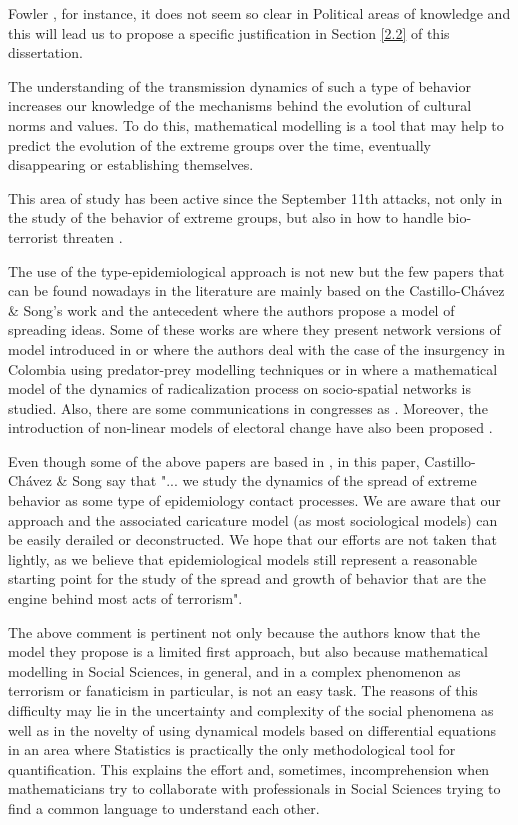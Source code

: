 Fowler \cite{CF}, for instance, it does not seem so clear in Political areas of knowledge and this will lead us to propose a specific justification in Section \ref{2.2} of this dissertation.

The understanding of the transmission dynamics of such a type of behavior increases our knowledge of the mechanisms behind the evolution of cultural norms and values. To do this, mathematical modelling is a tool that may help to predict the evolution of the extreme groups over the time, eventually disappearing or establishing themselves.

This area of study has been active since the September 11th attacks, not only in the study of the behavior of extreme groups, but also in how to handle bio-terrorist threaten \cite{libroF}.

The use of the type-epidemiological approach is not new but the few papers that can be found nowadays in the literature are mainly based on the Castillo-Ch\'avez \& Song's work \cite{Fanatismo} and the antecedent \cite{GoodIdea} where the authors propose a model of spreading ideas. Some of these works are \cite{stauffer1, stauffer2} where they present network versions of model introduced in \cite{Fanatismo} or \cite{Colomb} where the authors deal with the case of the insurgency in Colombia using predator-prey modelling techniques or in \cite{cherif} where a mathematical model of the dynamics of radicalization process on socio-spatial networks is studied. Also, there are some communications in congresses as \cite{Arney, Jairo, Jairo0}. Moreover, the introduction of non-linear models of electoral change have also been proposed \cite{WEISBERG}.

Even though some of the above papers are based in \cite{Fanatismo}, in this paper, Castillo-Ch\'avez \& Song say that "... we study the dynamics of the spread of extreme behavior as some type of epidemiology contact processes. We are aware that our approach and the associated caricature model (as most sociological models) can be easily derailed or deconstructed. We hope that our efforts are not taken that lightly, as we believe that epidemiological models still represent a reasonable starting point for the study of the spread and growth of behavior that are the engine behind most acts of terrorism".

The above comment is pertinent not only because the authors know that the model they propose is a limited first approach, but also because mathematical modelling in Social Sciences, in general, and in a complex phenomenon as terrorism or fanaticism in particular, is not an easy task. The reasons of this difficulty may lie in the uncertainty and complexity of the social phenomena as well as in the novelty of using dynamical models based on differential equations in an area where Statistics is practically the only methodological tool for quantification. This explains the effort and, sometimes, incomprehension when mathematicians try to collaborate with professionals in Social Sciences trying to find a common language to understand each other.

